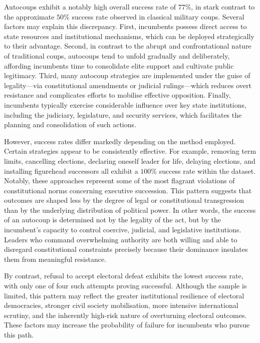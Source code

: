\documentclass[
  12pt,
]{report}
\begin{document}
Autocoups exhibit a notably high overall success rate of \(77\%\), in
stark contrast to the approximate \(50\%\) success rate observed in
classical military coups. Several factors may explain this discrepancy.
First, incumbents possess direct access to state resources and
institutional mechanisms, which can be deployed strategically to their
advantage. Second, in contrast to the abrupt and confrontational nature
of traditional coups, autocoups tend to unfold gradually and
deliberately, affording incumbents time to consolidate elite support and
cultivate public legitimacy. Third, many autocoup strategies are
implemented under the guise of legality---via constitutional amendments
or judicial rulings---which reduces overt resistance and complicates
efforts to mobilise effective opposition. Finally, incumbents typically
exercise considerable influence over key state institutions, including
the judiciary, legislature, and security services, which facilitates the
planning and consolidation of such actions.

However, success rates differ markedly depending on the method employed.
Certain strategies appear to be consistently effective. For example,
removing term limits, cancelling elections, declaring oneself leader for
life, delaying elections, and installing figurehead successors all
exhibit a \(100\%\) success rate within the dataset. Notably, these
approaches represent some of the most flagrant violations of
constitutional norms concerning executive succession. This pattern
suggests that outcomes are shaped less by the degree of legal or
constitutional transgression than by the underlying distribution of
political power. In other words, the success of an autocoup is
determined not by the legality of the act, but by the incumbent's
capacity to control coercive, judicial, and legislative institutions.
Leaders who command overwhelming authority are both willing and able to
disregard constitutional constraints precisely because their dominance
insulates them from meaningful resistance.

By contrast, refusal to accept electoral defeat exhibits the lowest
success rate, with only one of four such attempts proving successful.
Although the sample is limited, this pattern may reflect the greater
institutional resilience of electoral democracies, stronger civil
society mobilisation, more intensive international scrutiny, and the
inherently high-risk nature of overturning electoral outcomes. These
factors may increase the probability of failure for incumbents who
pursue this path.
\end{document}
